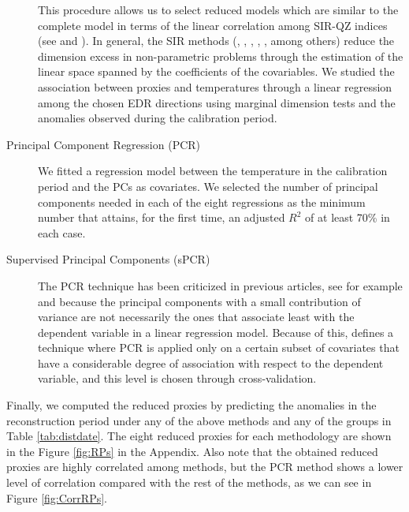 \documentclass[11pt]{amsart}
\theoremstyle{plain}
\theoremstyle{definition}
\theoremstyle{remark}
\begin{document}
\begin{description}
  This procedure allows us to select reduced models which are similar to the
  complete model in terms of the linear correlation among SIR-QZ indices (see
  \cite{Coudret2014} and \cite{Coudret2017}). In general, the SIR methods (\cite{Li1991},
  \cite{Duan1991}, \cite{Zhong2005}, \cite{Li2008}, \cite{Coudret2014}, \cite{Weisberg2002} among
  others) reduce the dimension excess in non-parametric problems through the
  estimation of the linear space spanned by the coefficients of the covariables.
  We studied the association between proxies and temperatures
  through a linear regression among the chosen EDR directions using marginal
  dimension tests and the anomalies observed
  during the calibration period. 
\item[Principal Component Regression (PCR)]
We fitted a regression model between the temperature in the calibration period and the PCs
as covariates. We selected the number of principal components needed in each of
the eight regressions as the minimum number that attains, for the first time, an adjusted
$R^2$ of at least 70\% in each case. 
\item[Supervised Principal Components (sPCR)]
The PCR technique has been criticized in previous articles, see for example
\cite{Jolliffe1982} and \cite{Tibshirani1996} because the principal components
with a small contribution of variance are not necessarily the ones that
associate least with the dependent variable in a linear regression model.
Because of this, \cite{Bair2006} defines a technique where PCR is applied only
on a certain subset of covariates that have a considerable degree of association
with respect to the dependent variable, and this level is chosen through cross-validation.
\end{description}
Finally, we computed the reduced proxies by predicting the anomalies in the
reconstruction period under any of the above methods and any of the groups in
Table \ref{tab:distdate}. The eight reduced proxies for each methodology are
shown in the Figure \ref{fig:RPs} in the Appendix. Also note that
the obtained reduced proxies are highly correlated among methods, but the PCR
method shows a lower level of correlation compared with the rest of the methods,
as we can see in Figure \ref{fig:CorrRPs}.  
\end{document}
